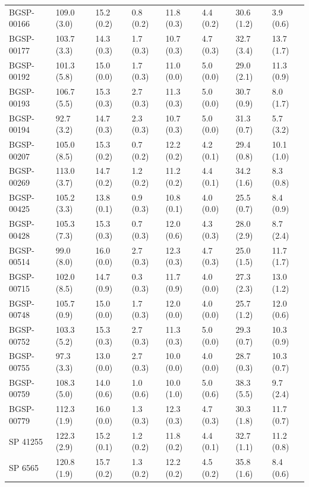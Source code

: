 \documentclass[12pt,oneside]{reedthesis}
\begin{document}
\begin{table}[!h]
{\begin{threeparttable}
\begin{tabular}[t]{llllllll}
BGSP-00166 & 109.0 (3.0) & 15.2 (0.2) & 0.8 (0.2) & 11.8 (0.3) & 4.4 (0.2) & 30.6 (1.2) & 3.9 (0.6)\\
\addlinespace
BGSP-00177 & 103.7 (3.3) & 14.3 (0.3) & 1.7 (0.3) & 10.7 (0.3) & 4.7 (0.3) & 32.7 (3.4) & 13.7 (1.7)\\
BGSP-00192 & 101.3 (5.8) & 15.0 (0.0) & 1.7 (0.3) & 11.0 (0.0) & 5.0 (0.0) & 29.0 (2.1) & 11.3 (0.9)\\
BGSP-00193 & 106.7 (5.5) & 15.3 (0.3) & 2.7 (0.3) & 11.3 (0.3) & 5.0 (0.0) & 30.7 (0.9) & 8.0 (1.7)\\
BGSP-00194 & 92.7 (3.2) & 14.7 (0.3) & 2.3 (0.3) & 10.7 (0.3) & 5.0 (0.0) & 31.3 (0.7) & 5.7 (3.2)\\
BGSP-00207 & 105.0 (8.5) & 15.3 (0.2) & 0.7 (0.2) & 12.2 (0.2) & 4.2 (0.1) & 29.4 (0.8) & 10.1 (1.0)\\
\addlinespace
BGSP-00269 & 113.0 (3.7) & 14.7 (0.2) & 1.2 (0.2) & 11.2 (0.2) & 4.4 (0.1) & 34.2 (1.6) & 8.3 (0.8)\\
BGSP-00425 & 105.2 (3.3) & 13.8 (0.1) & 0.9 (0.3) & 10.8 (0.1) & 4.0 (0.0) & 25.5 (0.7) & 8.4 (0.9)\\
BGSP-00428 & 105.3 (7.3) & 15.3 (0.3) & 0.7 (0.3) & 12.0 (0.6) & 4.3 (0.3) & 28.0 (2.9) & 8.7 (2.4)\\
BGSP-00514 & 99.0 (8.0) & 16.0 (0.0) & 2.7 (0.3) & 12.3 (0.3) & 4.7 (0.3) & 25.0 (1.5) & 11.7 (1.7)\\
BGSP-00715 & 102.0 (8.5) & 14.7 (0.9) & 0.3 (0.3) & 11.7 (0.9) & 4.0 (0.0) & 27.3 (2.3) & 13.0 (1.2)\\
\addlinespace
BGSP-00748 & 105.7 (0.9) & 15.0 (0.0) & 1.7 (0.3) & 12.0 (0.0) & 4.0 (0.0) & 25.7 (1.2) & 12.0 (0.6)\\
BGSP-00752 & 103.3 (5.2) & 15.3 (0.3) & 2.7 (0.3) & 11.3 (0.3) & 5.0 (0.0) & 29.3 (0.7) & 10.3 (0.9)\\
BGSP-00755 & 97.3 (3.3) & 13.0 (0.0) & 2.7 (0.3) & 10.0 (0.0) & 4.0 (0.0) & 28.7 (0.3) & 10.3 (0.7)\\
BGSP-00759 & 108.3 (5.0) & 14.0 (0.6) & 1.0 (0.6) & 10.0 (1.0) & 5.0 (0.6) & 38.3 (5.5) & 9.7 (2.4)\\
BGSP-00779 & 112.3 (1.9) & 16.0 (0.0) & 1.3 (0.3) & 12.3 (0.3) & 4.7 (0.3) & 30.3 (1.8) & 11.7 (0.7)\\
\addlinespace
SP 41255 & 122.3 (2.9) & 15.2 (0.1) & 1.2 (0.2) & 11.8 (0.2) & 4.4 (0.1) & 32.7 (1.1) & 11.2 (0.8)\\
SP 6565 & 120.8 (1.9) & 15.7 (0.2) & 1.3 (0.2) & 12.2 (0.2) & 4.5 (0.2) & 35.8 (1.6) & 8.4 (0.6)\\

\end{tabular}
\end{threeparttable}}
\end{table}
\end{document}
